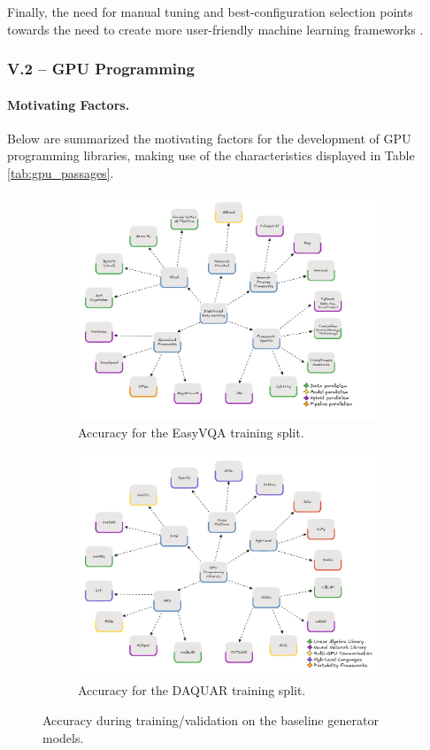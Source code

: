 Finally, the need for manual tuning and best-configuration selection points towards the need to
create more user-friendly machine learning frameworks .

\subsubsection{V.2 -- GPU Programming}
\paragraph{Motivating Factors.}
Below are summarized the motivating factors for the development of GPU programming libraries,
making use of the characteristics displayed in Table \ref{tab:gpu_passages}.

\begin{figure}
	\centering
	\begin{subfigure}{0.48\linewidth}
		\includegraphics[width=\textwidth]{figures/mindmap}
		\caption{Accuracy for the EasyVQA training split.}
		\label{fig:base-a}
	\end{subfigure}
	\hfill
	\begin{subfigure}{0.48\linewidth}
		\includegraphics[width=\textwidth]{figures/mindmap-cuda}
		\caption{Accuracy for the DAQUAR training split.}
		\label{fig:base-b}
	\end{subfigure}
	\caption{Accuracy during training/validation on the baseline generator models.}
	\label{fig:base}
\end{figure}
